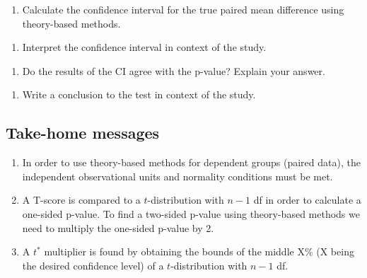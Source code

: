 \documentclass[
]{report}
\providecommand{\tightlist}{%
  \setlength{\itemsep}{0pt}\setlength{\parskip}{0pt}}
\begin{document}
\vspace{0.6in}

\begin{enumerate}
\def\labelenumi{\arabic{enumi}.}
\setcounter{enumi}{11}
\tightlist
\item
  Calculate the confidence interval for the true paired mean difference using theory-based methods.
\end{enumerate}

\newpage

\begin{enumerate}
\def\labelenumi{\arabic{enumi}.}
\setcounter{enumi}{12}
\tightlist
\item
  Interpret the confidence interval in context of the study.
\end{enumerate}

\vspace{1in}

\begin{enumerate}
\def\labelenumi{\arabic{enumi}.}
\setcounter{enumi}{13}
\tightlist
\item
  Do the results of the CI agree with the p-value? Explain your answer.
\end{enumerate}

\vspace{0.5in}

\begin{enumerate}
\def\labelenumi{\arabic{enumi}.}
\setcounter{enumi}{14}
\tightlist
\item
  Write a conclusion to the test in context of the study.
  \vspace{0.6in}
\end{enumerate}

\hypertarget{take-home-messages-3}{%
\subsection{Take-home messages}\label{take-home-messages-3}}

\begin{enumerate}
\def\labelenumi{\arabic{enumi}.}
\item
  In order to use theory-based methods for dependent groups (paired data), the independent observational units and normality conditions must be met.
\item
  A T-score is compared to a \(t\)-distribution with \(n - 1\) df in order to calculate a one-sided p-value. To find a two-sided p-value using theory-based methods we need to multiply the one-sided p-value by 2.
\item
  A \(t^*\) multiplier is found by obtaining the bounds of the middle X\% (X being the desired confidence level) of a \(t\)-distribution with \(n - 1\) df.
\end{enumerate}
\end{document}
